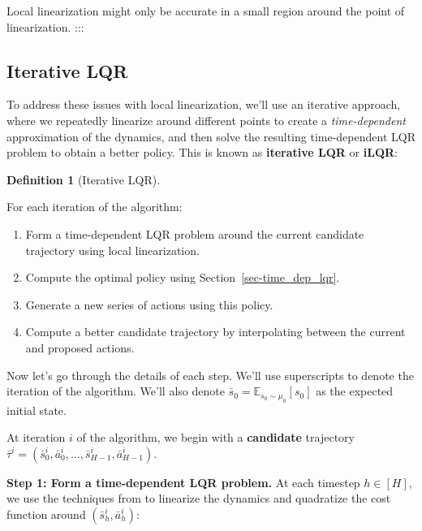 \documentclass[
  letterpaper,
  DIV=11,
  numbers=noendperiod]{scrreprt}
\providecommand{\tightlist}{%
  \setlength{\itemsep}{0pt}\setlength{\parskip}{0pt}}\usepackage{longtable,booktabs,array}
\theoremstyle{plain}
\theoremstyle{plain}
\theoremstyle{definition}
\theoremstyle{definition}
\newtheorem{definition}{Definition}[chapter]
\theoremstyle{remark}
\begin{document}
Local linearization might only be accurate in a small region around the
point of linearization. :::

\subsection{Iterative LQR}\label{sec-iterative_lqr}

To address these issues with local linearization, we'll use an iterative
approach, where we repeatedly linearize around different points to
create a \emph{time-dependent} approximation of the dynamics, and then
solve the resulting time-dependent LQR problem to obtain a better
policy. This is known as \textbf{iterative LQR} or \textbf{iLQR}:

\begin{definition}[Iterative
LQR]\protect\hypertarget{def-ilqr}{}\label{def-ilqr}

For each iteration of the algorithm:

\begin{enumerate}
\def\labelenumi{\arabic{enumi}.}
\tightlist
\item
  Form a time-dependent LQR problem around the current candidate
  trajectory using local linearization.
\item
  Compute the optimal policy using Section~\ref{sec-time_dep_lqr}.
\item
  Generate a new series of actions using this policy.
\item
  Compute a better candidate trajectory by interpolating between the
  current and proposed actions.
\end{enumerate}

\end{definition}

Now let's go through the details of each step. We'll use superscripts to
denote the iteration of the algorithm. We'll also denote
\(\bar s_0 = \mathbb{E}_{s_0 \sim \mu_0} [s_0]\) as the expected initial
state.

At iteration \(i\) of the algorithm, we begin with a \textbf{candidate}
trajectory
\(\bar \tau^i = (\bar s^i_0, \bar a^i_0, \dots, \bar s^i_{H-1}, \bar a^i_{H-1})\).

\textbf{Step 1: Form a time-dependent LQR problem.} At each timestep
\(h\in [H]\), we use the techniques from \hyperref[approx_nonlinear]{}
to linearize the dynamics and quadratize the cost function around
\((\bar s^i_h, \bar a^i_h)\):
\end{document}
